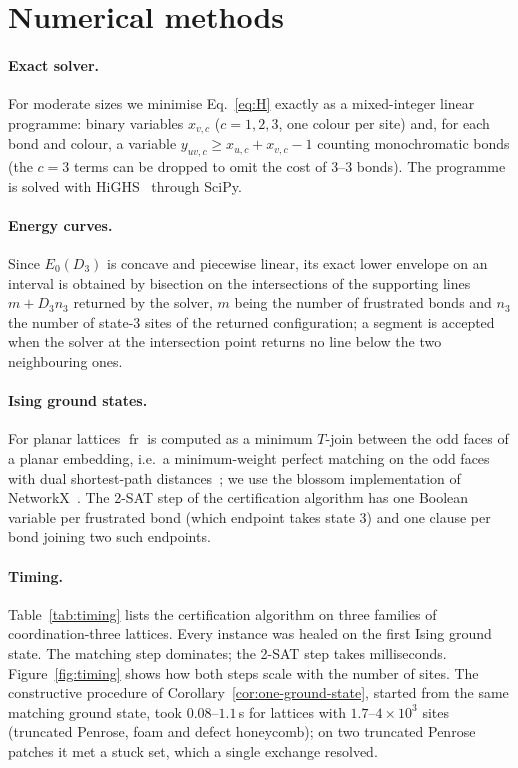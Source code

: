 \documentclass[aps,pre,twocolumn,floatfix,10pt]{revtex4-2}
\theoremstyle{definition}
\theoremstyle{remark}
\newcommand{\fr}{\operatorname{fr}}
\newcommand{\OPT}{E_0}
\begin{document}
\appendix
\section{Numerical methods}
\label{app:numerics}
\paragraph*{Exact solver.} For moderate sizes we minimise Eq.~\eqref{eq:H} exactly as a mixed-integer
linear programme: binary variables $x_{v,c}$ ($c=1,2,3$, one colour per site) and, for each bond
and colour, a variable $y_{uv,c}\ge x_{u,c}+x_{v,c}-1$ counting monochromatic bonds (the $c=3$
terms can be dropped to omit the cost of 3--3 bonds). The programme is solved with
HiGHS~\cite{HuangfuHall2018} through SciPy.
\paragraph*{Energy curves.} Since $\OPT(D_3)$ is concave and piecewise linear, its exact lower
envelope on an interval is obtained by bisection on the intersections of the supporting lines
$m+D_3 n_3$ returned by the solver, $m$ being the number of frustrated bonds and $n_3$ the number of
state-3 sites of the returned configuration; a segment is accepted when the solver at the intersection
point returns no line below the two neighbouring ones.
\paragraph*{Ising ground states.} For planar lattices $\fr$ is computed as a minimum $T$-join between
the odd faces of a planar embedding, i.e.\ a minimum-weight perfect matching on the odd faces with
dual shortest-path distances~\cite{Hadlock1975,Barahona1982}; we use the blossom implementation
of NetworkX~\cite{Hagberg2008}. The 2-SAT step of the certification algorithm has one Boolean variable per frustrated
bond (which endpoint takes state 3) and one clause per bond joining two such endpoints.
\paragraph*{Timing.} Table~\ref{tab:timing} lists the certification algorithm on three families of
coordination-three lattices. Every instance was healed on the first Ising ground state. The
matching step dominates; the 2-SAT step takes milliseconds. Figure~\ref{fig:timing} shows
how both steps scale with the number of sites. The constructive procedure of
Corollary~\ref{cor:one-ground-state}, started from the same matching ground state, took
$0.08$--$1.1$\,s for lattices with $1.7$--$4\times10^3$ sites (truncated Penrose, foam and defect
honeycomb); on two truncated Penrose patches it met a stuck set, which a single exchange resolved.
\end{document}
